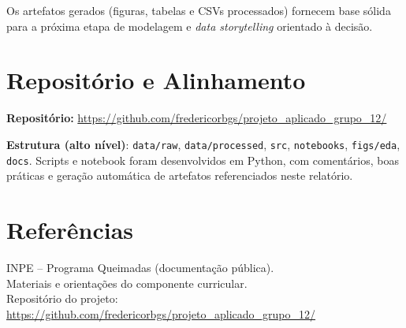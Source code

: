 \documentclass[12pt,a4paper]{report}
\newcommand{\repositorio}{\url{https://github.com/fredericorbgs/projeto_aplicado_grupo_12/}}
\begin{document}
\noindent Os artefatos gerados (figuras, tabelas e CSVs processados) fornecem base sólida para a próxima etapa de modelagem e \textit{data storytelling} orientado à decisão.

\chapter{Repositório e Alinhamento}

\noindent \textbf{Repositório:} \repositorio

\noindent\textbf{Estrutura (alto nível)}: \texttt{data/raw}, \texttt{data/processed}, \texttt{src}, \texttt{notebooks}, \texttt{figs/eda}, \texttt{docs}.  
Scripts e notebook foram desenvolvidos em Python, com comentários, boas práticas e geração automática de artefatos referenciados neste relatório.

\chapter*{Referências}
INPE -- Programa Queimadas (documentação pública).\\
Materiais e orientações do componente curricular.\\
Repositório do projeto: \repositorio
\end{document}
